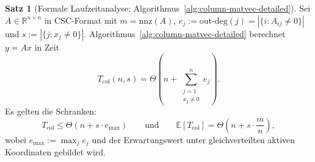 \documentclass[a4paper,12pt]{report}
\theoremstyle{definition}
\newtheorem{satz}{Satz}
\begin{document}
	\begin{satz}[Formale Laufzeitanalyse: Algorithmus~\ref{alg:column-matvec-detailed}]
		\label{satz:laufzeit-col-matvec}
		Sei $A \in \mathbb{R}^{n \times n}$ in CSC-Format mit $m = \mathrm{nnz}(A)$, $e_j := \mathrm{out\text{-}deg}(j) = |\{i : A_{ij} \neq 0\}|$ und $s := |\{j : x_j \neq 0\}|$. Algorithmus~\ref{alg:column-matvec-detailed} berechnet $y = Ax$ in Zeit
		\[
			T_{\mathrm{col}}(n,s) = \Theta\!\left(n + \sum_{\substack{j=1 \\ x_j \neq 0}}^{n} e_j\right).
		\]
		Es gelten die Schranken:
		\[
			T_{\mathrm{col}} \leq \Theta(n + s \cdot e_{\max}) \qquad \text{und} \qquad \mathbb{E}[T_{\mathrm{col}}] = \Theta\!\left(n + s \cdot \frac{m}{n}\right),
		\]
		wobei $e_{\max} := \max_j e_j$ und der Erwartungswert unter gleichverteilten aktiven Koordinaten gebildet wird.
	\end{satz}
\end{document}
